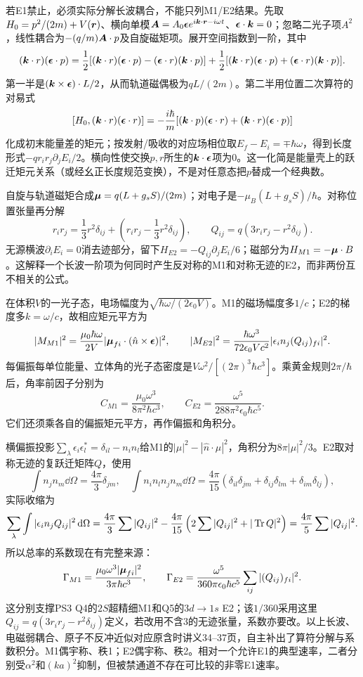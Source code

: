 若E1禁止，必须实际分解长波耦合，不能只列M1/E2结果。先取$H_0=p^2/(2m)+V(\boldsymbol{r})$、横向单模$\boldsymbol{A}=A_0\boldsymbol{\epsilon} e^{i\boldsymbol{k}\cdot\boldsymbol{r}-i\omega t}$、$\boldsymbol{\epsilon}\cdot\boldsymbol{k}=0$；忽略二光子项$A^2$，线性耦合为$-(q/m)\boldsymbol{A}\cdot p$及自旋磁矩项。展开空间指数到一阶，其中
\[
 (\boldsymbol{k}\cdot r)(\boldsymbol{\epsilon}\cdot p)
 =\frac12[(\boldsymbol{k}\cdot r)(\boldsymbol{\epsilon}\cdot p)-(\boldsymbol{\epsilon}\cdot r)(\boldsymbol{k}\cdot p)]
 +\frac12[(\boldsymbol{k}\cdot r)(\boldsymbol{\epsilon}\cdot p)+(\boldsymbol{\epsilon}\cdot r)(\boldsymbol{k}\cdot p)].
\]
第一半是$(\boldsymbol{k}\times\boldsymbol{\epsilon})\cdot L/2$，从而轨道磁偶极为$qL/(2m)$。第二半用位置二次算符的对易式
\[
 [H_0,(\boldsymbol{k}\cdot r)(\boldsymbol{\epsilon}\cdot r)]
 =-\frac{i\hbar}m[(\boldsymbol{k}\cdot p)(\boldsymbol{\epsilon}\cdot r)+(\boldsymbol{k}\cdot r)(\boldsymbol{\epsilon}\cdot p)]
\]
化成初末能量差的矩元；按发射/吸收的对应场相位取$E_f-E_i=\mp\hbar\omega$，得到长度形式$-q r_ir_j\partial_jE_i/2$。横向性使交换$p,r$所生的$\boldsymbol{k}\cdot\boldsymbol{\epsilon}$项为0。这一化简是能量壳上的跃迁矩元关系（或经幺正长度规范变换），不是对任意态把$p$替成一个经典数。

自旋与轨道磁矩合成$\boldsymbol{\mu}=q(L+g_sS)/(2m)$；对电子是$-\mu_B(L+g_sS)/\hbar$。对称位置张量再分解
\[
 r_ir_j=\frac13r^2\delta_{ij}+\left(r_ir_j-\frac13r^2\delta_{ij}\right),\qquad
 Q_{ij}=q(3r_ir_j-r^2\delta_{ij}).
\]
无源横波$\partial_iE_i=0$消去迹部分，留下$H_{E2}=-Q_{ij}\partial_jE_i/6$；磁部分为$H_{M1}=-\boldsymbol{\mu}\cdot B$。这解释一个长波一阶项为何同时产生反对称的M1和对称无迹的E2，而非两份互不相关的公式。

在体积$V$的一光子态，电场幅度为$\sqrt{\hbar\omega/(2\epsilon_0V)}$。M1的磁场幅度多$1/c$；E2的梯度多$k=\omega/c$，故相应矩元平方为
\[
 |M_{M1}|^2=\frac{\mu_0\hbar\omega}{2V}|\boldsymbol{\mu}_{fi}\cdot(\hat n\times\boldsymbol{\epsilon})|^2,\qquad
 |M_{E2}|^2=\frac{\hbar\omega^3}{72\epsilon_0Vc^2}|\epsilon_i n_j(Q_{ij})_{fi}|^2.
\]
每偏振每单位能量、立体角的光子态密度是$V\omega^2/[(2\pi)^3\hbar c^3]$。乘黄金规则$2\pi/\hbar$后，角率前因子分别为
\[
 C_{M1}=\frac{\mu_0\omega^3}{8\pi^2\hbar c^3},\qquad
 C_{E2}=\frac{\omega^5}{288\pi^2\epsilon_0\hbar c^5}.
\]
它们还须乘各自的偏振矩元平方，再作偏振和角积分。

横偏振投影$\sum_\lambda\epsilon_i\epsilon_l^*=\delta_{il}-n_in_l$给M1的$|\mu|^2-|\hat n\cdot\mu|^2$，角积分为$8\pi|\mu|^2/3$。E2取对称无迹的复跃迁矩阵$Q$，使用
\[
 \int n_jn_m\dd\Omega=\frac{4\pi}3\delta_{jm},\quad
 \int n_in_ln_jn_m\dd\Omega=\frac{4\pi}{15}
 (\delta_{il}\delta_{jm}+\delta_{ij}\delta_{lm}+\delta_{im}\delta_{lj}),
\]
实际收缩为
\[
 \sum_\lambda\int|\epsilon_i n_jQ_{ij}|^2\,\mathrm d\Omega
 =\frac{4\pi}3\sum|Q_{ij}|^2
 -\frac{4\pi}{15}\left(2\sum|Q_{ij}|^2+|\operatorname{Tr} Q|^2\right)
 =\frac{4\pi}5\sum|Q_{ij}|^2.
\]
所以总率的系数现在有完整来源：
\[
 \Gamma_{M1}=\frac{\mu_0\omega^3|\boldsymbol{\mu}_{fi}|^2}{3\pi\hbar c^3},\qquad
 \Gamma_{E2}=\frac{\omega^5}{360\pi\epsilon_0\hbar c^5}\sum_{ij}|(Q_{ij})_{fi}|^2.
\]
这分别支撑PS3 Q4的$2S$超精细M1和Q5的$3d\to1s$ E2；该$1/360$采用这里$Q_{ij}=q(3r_ir_j-r^2\delta_{ij})$定义，若改用不含3的无迹张量，系数亦要改。以上长波、电磁弱耦合、原子不反冲近似对应原含时讲义34--37页，自主补出了算符分解与系数积分。M1偶宇称、秩1；E2偶宇称、秩2。相对一个允许E1的典型速率，二者分别受$\alpha^2$和$(ka)^2$抑制，但被禁通道不存在可比较的非零E1速率。


